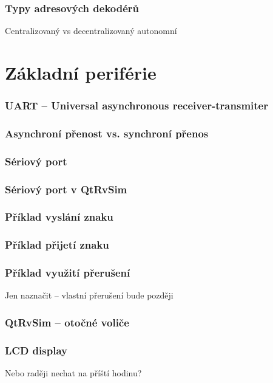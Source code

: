 \documentclass{beamer}
\begin{document}
\begin{frame}
\frametitle{Typy adresových dekodérů}

Centralizovaný vs decentralizovaný autonomní
\end{frame}

\section{Základní periférie}

\begin{frame}
\frametitle{UART -- Universal asynchronous receiver-transmiter}

\end{frame}


\begin{frame}
\frametitle{Asynchroní přenost vs. synchroní přenos}

\end{frame}


\begin{frame}
\frametitle{Sériový port}

\end{frame}

\begin{frame}
\frametitle{Sériový port v QtRvSim}

\end{frame}

\begin{frame}
\frametitle{Příklad vyslání znaku}

\end{frame}

\begin{frame}
\frametitle{Příklad přijetí znaku}

\end{frame}

\begin{frame}
\frametitle{Příklad využití přerušení}

Jen naznačit -- vlastní přerušení bude později
\end{frame}

\begin{frame}
\frametitle{QtRvSim -- otočné voliče}

\end{frame}

\begin{frame}
\frametitle{LCD display}

Nebo raději nechat na příští hodinu?
\end{frame}
\end{document}
